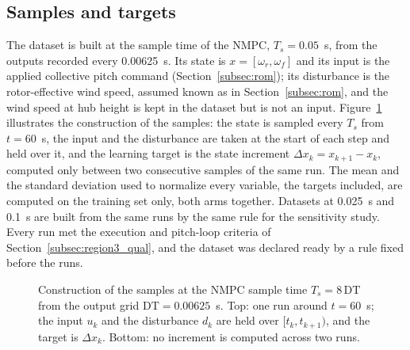 \subsection{Samples and targets}
\label{subsec:samples}
{\color{revQ1}
The dataset is built at the sample time of the NMPC, $T_s = 0.05$~s, from the outputs recorded every 0.00625~s. Its state is $x = [\omega_r, \omega_f]$ and its input is the applied collective pitch command (Section~\ref{subsec:rom}); its disturbance is the rotor-effective wind speed, assumed known as in Section~\ref{subsec:rom}, and the wind speed at hub height is kept in the dataset but is not an input. Figure~\ref{fig:E4_sampling} illustrates the construction of the samples: the state is sampled every $T_s$ from $t = 60$~s, the input and the disturbance are taken at the start of each step and held over it, and the learning target is the state increment $\Delta x_k = x_{k+1} - x_k$, computed only between two consecutive samples of the same run. The mean and the standard deviation used to normalize every variable, the targets included, are computed on the training set only, both arms together. Datasets at 0.025~s and 0.1~s are built from the same runs by the same rule for the sensitivity study. Every run met the execution and pitch-loop criteria of Section~\ref{subsec:region3_qual}, and the dataset was declared ready by a rule fixed before the runs.
}

\begin{figure}[htbp]
\centering

\caption{{\color{revQ1}Construction of the samples at the NMPC sample time $T_s = 8\,\mathrm{DT}$ from the output grid $\mathrm{DT} = 0.00625$~s. Top: one run around $t = 60$~s; the input $u_k$ and the disturbance $d_k$ are held over $[t_k, t_{k+1})$, and the target is $\Delta x_k$. Bottom: no increment is computed across two runs.}}
\label{fig:E4_sampling}
\end{figure}
